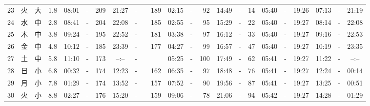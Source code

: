\documentclass[12pt,a4j]{jsarticle}
\begin{document}
\begin{table}[htbp]
\begin{center}
{\begin{tabular}{|rc|cr|ccrccr|ccrccr|ccc|ccc|}
23 & 火 & 大 &  1.8 &  08:01 &-& 209 &  21:27 &-& 189 &  02:15 &-&  92 &  14:49 &-&  14 & 05:40 & -& 19:26 & 07:13 & -& 21:19 \\
24 & 水 & 中 &  2.8 &  08:41 &-& 204 &  22:08 &-& 185 &  02:55 &-&  95 &  15:29 &-&  22 & 05:40 & -& 19:27 & 08:14 & -& 22:08 \\
25 & 木 & 中 &  3.8 &  09:24 &-& 195 &  22:52 &-& 181 &  03:38 &-&  97 &  16:12 &-&  33 & 05:40 & -& 19:27 & 09:16 & -& 22:53 \\
26 & 金 & 中 &  4.8 &  10:12 &-& 185 &  23:39 &-& 177 &  04:27 &-&  99 &  16:57 &-&  47 & 05:40 & -& 19:27 & 10:19 & -& 23:35 \\
27 & 土 & 中 &  5.8 &  11:10 &-& 173 &  --:-- &-&~~~~~ &  05:25 &-& 100 &  17:49 &-&  62 & 05:41 & -& 19:27 & 11:22 & -& --:-- \\
28 & 日 & 小 &  6.8 &  00:32 &-& 174 &  12:23 &-& 162 &  06:35 &-&  97 &  18:48 &-&  76 & 05:41 & -& 19:27 & 12:24 & -& 00:14 \\
29 & 月 & 小 &  7.8 &  01:29 &-& 174 &  13:52 &-& 157 &  07:52 &-&  90 &  19:56 &-&  87 & 05:41 & -& 19:27 & 13:25 & -& 00:51 \\
30 & 火 & 小 &  8.8 &  02:27 &-& 176 &  15:20 &-& 159 &  09:06 &-&  78 &  21:06 &-&  94 & 05:42 & -& 19:27 & 14:28 & -& 01:29 \\
   \hline
   \end{tabular}}
   \end{center}
\end{table}
\newpage
\end{document}
